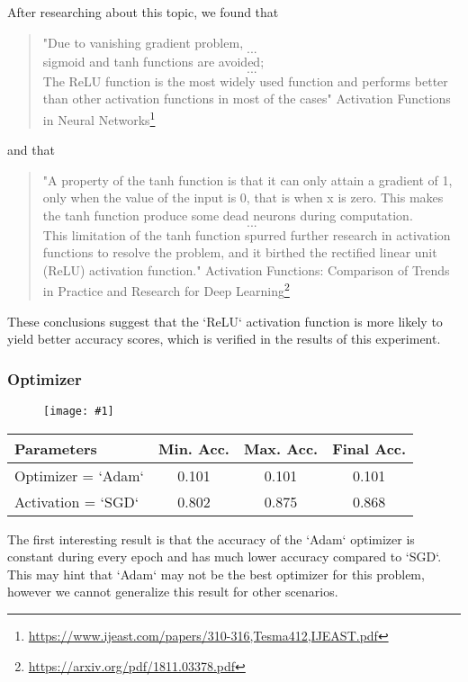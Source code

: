 \documentclass[10pt]{article}
\newcommand{\img}[1]{\begin{figure}[H]\centering\texttt{[image: \#1]}\end{figure}}
\begin{document}
After researching about this topic, we found that
\begin{quote}
"Due to vanishing gradient problem, \[...\] sigmoid and tanh functions are avoided; \[...\] The ReLU function is the most widely used function and performs better than other activation functions in most of the cases"  
Activation Functions in Neural Networks\footnote{\url{https://www.ijeast.com/papers/310-316,Tesma412,IJEAST.pdf}}
\end{quote}

and that
\begin{quote}
"A property of the tanh function is that it can only attain a gradient of 1, only when the value of the input is 0, that is when x is zero. This makes the tanh function produce some dead neurons during computation. \[...\] This limitation of the tanh function spurred further research in activation functions to resolve the problem, and it birthed the rectified linear unit (ReLU) activation function."  
Activation Functions: Comparison of Trends in Practice and Research for Deep Learning\footnote{\url{https://arxiv.org/pdf/1811.03378.pdf}}
\end{quote}

These conclusions suggest that the `ReLU` activation function is more likely to yield better accuracy scores, which is verified in the results of this experiment.

\subsubsection{Optimizer}

\img{tuning/optimizer.png}

\begin{center}
\begin{tabular}{||l|c|c|c||}
\hline
Parameters         & Min. Acc. & Max. Acc. & Final Acc. \\
\hline\hline
Optimizer = `Adam` & 0.101     & 0.101     & 0.101      \\
\hline
Activation = `SGD` & 0.802     & 0.875     & 0.868      \\
\hline
\end{tabular}
\end{center}
The first interesting result is that the accuracy of the `Adam` optimizer is constant during every epoch and has much lower accuracy compared to `SGD`.
This may hint that `Adam` may not be the best optimizer for this problem, however we cannot generalize this result for other scenarios.
\end{document}
